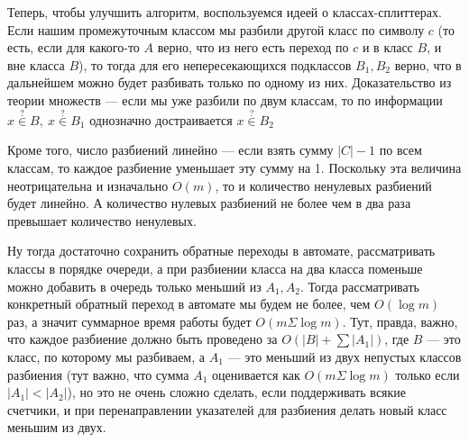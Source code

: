 \documentclass[12pt]{article}
\begin{document}
Теперь, чтобы улучшить алгоритм, воспользуемся идеей о классах-сплиттерах. Если нашим промежуточным классом мы разбили другой класс по символу $c$ (то есть, если для какого-то $A$ верно, что из него есть переход по $c$ и в класс $B$, и вне класса $B$), то тогда для его непересекающихся подклассов $B_1, B_2$ верно, что в дальнейшем можно будет разбивать только по одному из них. Доказательство из теории множеств --- если мы уже разбили по двум классам, то по информации $x \stackrel{?}{\in} B,\ x \stackrel{?}{\in} B_1$ однозначно достраивается $x \stackrel{?}{\in} B_2$

Кроме того, число разбиений линейно --- если взять сумму $|C| - 1$ по всем классам, то каждое разбиение уменьшает эту сумму на 1. Поскольку эта величина неотрицательна и изначально $O(m)$, то и количество ненулевых разбиений будет линейно. А количество нулевых разбиений не более чем в два раза превышает количество ненулевых.

Ну тогда достаточно сохранить обратные переходы в автомате, рассматривать классы в порядке очереди, а при разбиении класса на два класса поменьше можно добавить в очередь только меньший из $A_1, A_2$. Тогда рассматривать конкретный обратный переход в автомате мы будем не более, чем $O(\log m)$ раз, а значит суммарное время работы будет $O(m \Sigma \log m)$. Тут, правда, важно, что каждое разбиение должно быть проведено за $O(|B| + \sum |A_1|)$, где $B$ --- это класс, по которому мы разбиваем, а $A_1$ --- это меньший из двух непустых классов разбиения (тут важно, что сумма $A_1$ оценивается как $O(m \Sigma \log m)$ только если $|A_1| < |A_2|$), но это не очень сложно сделать, если поддерживать всякие счетчики, и при перенаправлении указателей для разбиения делать новый класс меньшим из двух.
\end{document}
